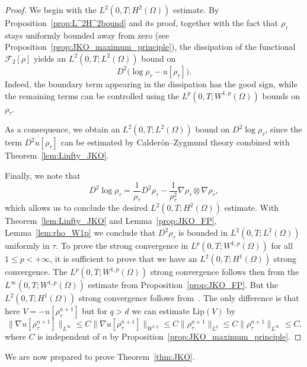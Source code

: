 \documentclass[a4paper,twosided, 11pt]{article}
\renewcommand{\color}[2][]{}
\theoremstyle{plain}
\theoremstyle{remark}
\numberwithin{equation}{section}
\begin{document}
\begin{proof}
{\color{blue}We begin with the $L^{2}(0,T;H^{2}(\Omega))$ estimate. By Proposition~\ref{prop:L^2H^2bound} and its proof, together with the fact that $\rho_\tau$ stays uniformly bounded away from zero (see Proposition~\ref{prop:JKO_maximum_principle}), the dissipation of the functional $\mathcal{F}_2[\rho]$ yields an
$L^{2}(0,T;L^{2}(\Omega))$ bound on
\[
D^{2}\bigl(\log\rho_\tau - u[\rho_\tau]\bigr).
\]
Indeed, the boundary term appearing in the dissipation has the good sign, while the remaining terms can be controlled using the $L^{p}(0,T;W^{1,p}(\Omega))$ bounds on $\rho_\tau$.

As a consequence, we obtain an $L^{2}(0,T;L^{2}(\Omega))$ bound on $D^{2}\log\rho_\tau$, since the term $D^{2}u[\rho_\tau]$ can be estimated by Calderón--Zygmund theory combined with Theorem~\ref{lem:Linfty_JKO}.} Finally, we note that
\[
D^{2}\log\rho_\tau
= \frac{1}{\rho_\tau} D^{2}\rho_\tau
- \frac{1}{\rho_\tau^{2}} \nabla\rho_\tau \otimes \nabla\rho_\tau,
\]
which allows us to conclude the desired $L^{2}(0,T;H^{2}(\Omega))$ estimate.
With Theorem~\ref{lem:Linfty_JKO} and Lemma~\ref{prop:JKO_FP}, Lemma~\ref{lem:rho_W1p} we conclude that $D^{2}\rho_{\tau}$ is bounded in $L^{2}(0,T; L^{2}(\Omega))$ uniformly in $\tau$. To prove the strong convergence in $L^{p}(0,T; W^{1,p}(\Omega))$ for all $1\le p<+\infty$, it is sufficient to prove that we have an $L^{2}(0,T; H^{1}(\Omega))$ strong convergence. The $L^{p}(0,T; W^{1,p}(\Omega))$ strong convergence follows then from the $L^{\infty}(0,T; W^{1,p}(\Omega))$ estimate from Proposition~\ref{prop:JKO_FP}. But the $L^{2}(0,T; H^{1}(\Omega))$ strong convergence follows from~\cite[Proposition 4.1]{toshpulatov}. The only difference is that here $V=-u[\rho^{n+1}_{\tau}]$ but for $q>d$ we can estimate $\text{Lip}(V)$ by
$$
\|\nabla u[\rho^{n+1}_{\tau}]\|_{L^{\infty}}\le C\|\nabla u[\rho^{n+1}_{\tau}]\|_{W^{1,q}} \le C\|\rho^{n+1}_{\tau}\|_{L^{q}}\le C\|\rho^{n+1}_{\tau}\|_{L^{\infty}}\le C. 
$$
where $C$ is independent of $n$ by Proposition~\ref{prop:JKO_maximum_principle}.
\end{proof}

We are now prepared to prove Theorem~\ref{thm:JKO}.
\end{document}
